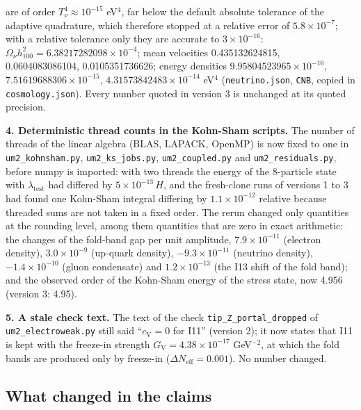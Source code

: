 \documentclass[
  10pt,
]{article}
\begin{document}
are of order \(T_\nu^4 \approx 10^{-15}\) eV\(^4\), far below the
default absolute tolerance of the adaptive quadrature, which therefore
stopped at a relative error of \(5.8\times10^{-7}\); with a relative
tolerance only they are accurate to \(3\times10^{-16}\):
\(\Omega_\nu h_{100}^2 = 6.38217282098\times10^{-4}\); mean velocities
0.435132624815, 0.0604083086104, 0.0105351736626; energy densities
\(9.95804523965\times10^{-16}\), \(7.51619688306\times10^{-15}\),
\(4.31573842483\times10^{-14}\) eV\(^4\) (\texttt{neutrino.json},
\texttt{CNB}, copied in \texttt{cosmology.json}). Every number quoted in
version 3 is unchanged at its quoted precision.

\textbf{4. Deterministic thread counts in the Kohn-Sham scripts.} The
number of threads of the linear algebra (BLAS, LAPACK, OpenMP) is now
fixed to one in \texttt{um2\_kohnsham.py}, \texttt{um2\_ks\_jobs.py},
\texttt{um2\_coupled.py} and \texttt{um2\_residuals.py}, before numpy is
imported: with two threads the energy of the 8-particle state with
\(\lambda_{\mathrm{test}}\) had differed by \(5\times10^{-13}\,H\), and
the fresh-clone runs of versions 1 to 3 had found one Kohn-Sham integral
differing by \(1.1\times10^{-12}\) relative because threaded sums are
not taken in a fixed order. The rerun changed only quantities at the
rounding level, among them quantities that are zero in exact arithmetic:
the changes of the fold-band gap per unit amplitude,
\(7.9\times10^{-11}\) (electron density), \(3.0\times10^{-9}\) (up-quark
density), \(-9.3\times10^{-11}\) (neutrino density),
\(-1.4\times10^{-10}\) (gluon condensate) and \(1.2\times10^{-13}\) (the
I13 shift of the fold band); and the observed order of the Kohn-Sham
energy of the stress state, now 4.956 (version 3: 4.95).

\textbf{5. A stale check text.} The text of the check
\texttt{tip\_Z\_portal\_dropped} of \texttt{um2\_electroweak.py} still
said ``\(c_{\mathrm{V}} = 0\) for I11'' (version 2); it now states that
I11 is kept with the freeze-in strength
\(G_{\mathrm{V}} = 4.38\times10^{-17}\) GeV\(^{-2}\), at which the fold
bands are produced only by freeze-in
(\(\Delta N_{\mathrm{eff}} = 0.001\)). No number changed.

\hypertarget{what-changed-in-the-claims}{%
\subsection{What changed in the
claims}\label{what-changed-in-the-claims}}
\end{document}
